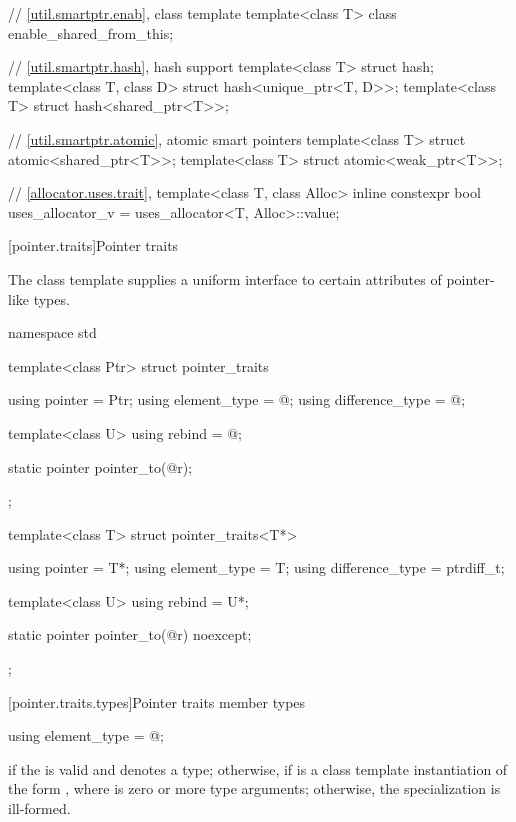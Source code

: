 \begin{codeblock}
{  // \ref{util.smartptr.enab}, class template 
  template<class T> class enable_shared_from_this;

  // \ref{util.smartptr.hash}, hash support
  template<class T> struct hash;
  template<class T, class D> struct hash<unique_ptr<T, D>>;
  template<class T> struct hash<shared_ptr<T>>;

  // \ref{util.smartptr.atomic}, atomic smart pointers
  template<class T> struct atomic<shared_ptr<T>>;
  template<class T> struct atomic<weak_ptr<T>>;

  // \ref{allocator.uses.trait}, 
  template<class T, class Alloc>
    inline constexpr bool uses_allocator_v = uses_allocator<T, Alloc>::value;
}
\end{codeblock}

[pointer.traits]{Pointer traits}

\pnum
The class template  supplies a uniform interface to certain
attributes of pointer-like types.

%
\begin{codeblock}
namespace std {
  template<class Ptr> struct pointer_traits {
    using pointer         = Ptr;
    using element_type    = @\seebelow@;
    using difference_type = @\seebelow@;

    template<class U> using rebind = @\seebelow@;

    static pointer pointer_to(@\seebelow@ r);
  };

  template<class T> struct pointer_traits<T*> {
    using pointer         = T*;
    using element_type    = T;
    using difference_type = ptrdiff_t;

    template<class U> using rebind = U*;

    static pointer pointer_to(@\seebelow@ r) noexcept;
  };
}
\end{codeblock}

[pointer.traits.types]{Pointer traits member types}

%
\begin{itemdecl}
using element_type = @\seebelow@;
\end{itemdecl}

\begin{itemdescr}
\pnum
\ctype {} if
the   is valid and denotes a
type; otherwise,  if
 is a class template instantiation of the form ,
where  is zero or more type arguments; otherwise, the specialization is
ill-formed.
\end{itemdescr}

